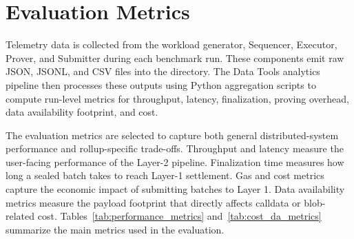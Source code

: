 
\section{Evaluation Metrics}
\label{sec:evaluation_metrics}

Telemetry data is collected from the workload generator, Sequencer, Executor, Prover, and Submitter during each benchmark run. These components emit raw JSON, JSONL, and CSV files into the  directory. The Data Tools analytics pipeline then processes these outputs using Python aggregation scripts to compute run-level metrics for throughput, latency, finalization, proving overhead, data availability footprint, and cost.

The evaluation metrics are selected to capture both general distributed-system performance and rollup-specific trade-offs. Throughput and latency measure the user-facing performance of the Layer-2 pipeline. Finalization time measures how long a sealed batch takes to reach Layer-1 settlement. Gas and cost metrics capture the economic impact of submitting batches to Layer 1. Data availability metrics measure the payload footprint that directly affects calldata or blob-related cost. Tables~\ref{tab:performance_metrics} and~\ref{tab:cost_da_metrics} summarize the main metrics used in the evaluation.

